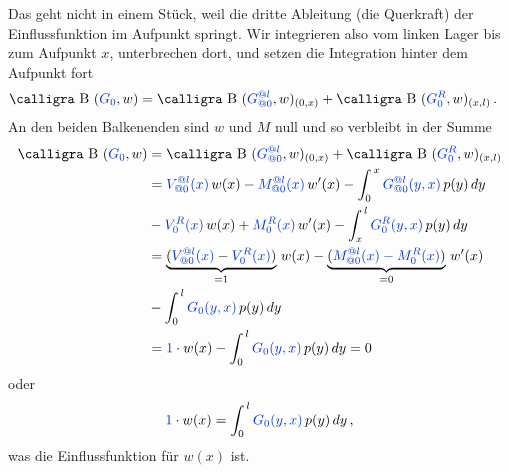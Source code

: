 Das geht nicht in einem St\"{u}ck, weil die dritte Ableitung (die Querkraft) der Einflussfunktion im Aufpunkt springt. Wir integrieren also vom linken Lager bis zum Aufpunkt $x$, unterbrechen dort, und setzen die Integration hinter dem Aufpunkt fort
\begin{align}
\text{\normalfont\calligra B\,\,}(\textcolor{chapterTitleBlue}{G_0},w) &= \text{\normalfont\calligra B\,\,}(\textcolor{chapterTitleBlue}{G_{@0}^{@l}},w)_{(0,x)} + \text{\normalfont\calligra B\,\,}(\textcolor{chapterTitleBlue}{G_0^R},w)_{(x,l)}\,.
\end{align}
An den beiden Balkenenden sind $w$ und $M$ null und so verbleibt in der Summe
\begin{align}
\text{\normalfont\calligra B\,\,}(\textcolor{chapterTitleBlue}{G_0},w) &= \text{\normalfont\calligra B\,\,}(\textcolor{chapterTitleBlue}{G_{@0}^{@l}},w)_{(0,x)} + \text{\normalfont\calligra B\,\,}(\textcolor{chapterTitleBlue}{G_0^R},w)_{(x,l)}\nn \\
 & = \textcolor{chapterTitleBlue}{V_{@0}^{@l}(x)}\,w(x) - \textcolor{chapterTitleBlue}{M_{@0}^{@l}(x)}\,w'(x) - \int_0^{\,x} \textcolor{chapterTitleBlue}{G_{@0}^{@l}(y,x)}\,p(y)\,dy\nn \\
 &- \textcolor{chapterTitleBlue}{V_0^R(x)}\,w(x) + \textcolor{chapterTitleBlue}{M_0^R(x)}\,w'(x)- \int_x^{\,l} \textcolor{chapterTitleBlue}{G_0^R(y,x)}\,p(y)\,dy \nn \\
 &= \underbrace{(\textcolor{chapterTitleBlue}{V_{@0}^{@l}(x)} - \textcolor{chapterTitleBlue}{V_0^R(x)})}_{= 1}\,w(x) - \underbrace{(\textcolor{chapterTitleBlue}{M_{@0}^{@l}(x) - M_0^R(x)})}_{= 0}\,w'(x)\nn\\
  &- \int_0^{\,l} \textcolor{chapterTitleBlue}{G_0(y,x)}\,p(y)\,dy\nn \\
  &= \textcolor{chapterTitleBlue}{1}\cdot w(x) - \int_0^{\,l} \textcolor{chapterTitleBlue}{G_0(y,x)}\,p(y)\,dy = 0
\end{align}
oder
\begin{align}
\textcolor{chapterTitleBlue}{1}\cdot w(x) = \int_0^{\,l} \textcolor{chapterTitleBlue}{G_0(y,x)}\,p(y)\,dy\,,
\end{align}
was die Einflussfunktion f\"{u}r $w(x)$ ist.

